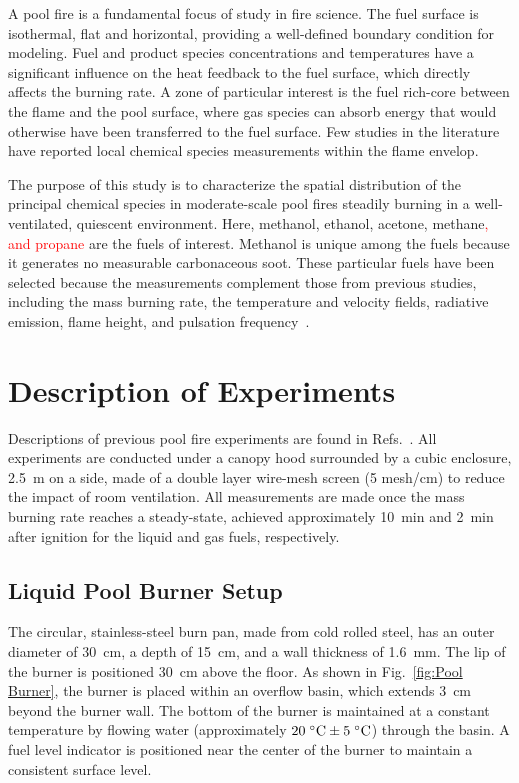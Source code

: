 \documentclass[12pt]{article}
\begin{document}
A pool fire is a fundamental focus of study in fire science. The fuel surface is isothermal, flat and horizontal, providing a well-defined boundary condition for modeling. Fuel and product species concentrations and temperatures have a significant influence on the heat feedback to the fuel surface, which directly affects the burning rate. A zone of particular interest is the fuel rich-core between the flame and the pool surface, where gas species can absorb energy that would otherwise have been transferred to the fuel surface. Few studies in the literature have reported local chemical species measurements within the flame envelop.

The purpose of this study is to characterize the spatial distribution of the principal chemical species in moderate-scale pool fires steadily burning in a well-ventilated, quiescent environment. Here, methanol, ethanol, acetone, methane\textcolor{red}{, and propane} are the fuels of interest. Methanol is unique among the fuels because it generates no measurable carbonaceous soot. These particular fuels have been selected because the measurements complement those from previous studies, including the mass burning rate, the temperature and velocity fields, radiative emission, flame height, and pulsation frequency~\cite{Fisher1987,Hamins2016}.


\clearpage

\section{Description of Experiments}
\label{sec:Experiments}

Descriptions of previous pool fire experiments are found in Refs.~\cite{Hamins2016,Hamins1994,Hamins1991,Hamins1996,Lock2008}. All experiments are conducted under a canopy hood surrounded by a cubic enclosure, 2.5~m on a side, made of a double layer wire-mesh screen (5 mesh/cm) to reduce the impact of room ventilation. All measurements are made once the mass burning rate reaches a steady-state, achieved approximately 10~min and 2~min after ignition for the liquid and gas fuels, respectively.

\subsection{Liquid Pool Burner Setup}
\label{ssec:Liquid_Pool_Burner_Setup}

The circular, stainless-steel burn pan, made from cold rolled steel, has an outer diameter of 30~cm, a depth of 15~cm, and a wall thickness of 1.6~mm. The lip of the burner is positioned 30~cm above the floor. As shown in Fig.~\ref{fig:Pool Burner}, the burner is placed within an overflow basin, which extends 3~cm beyond the burner wall. The bottom of the burner is maintained at a constant temperature by flowing water (approximately $20 \; ^\circ \hbox{C} \pm 5 \; ^\circ \hbox{C}$) through the basin. A fuel level indicator is positioned near the center of the burner to maintain a consistent surface level.
\end{document}
